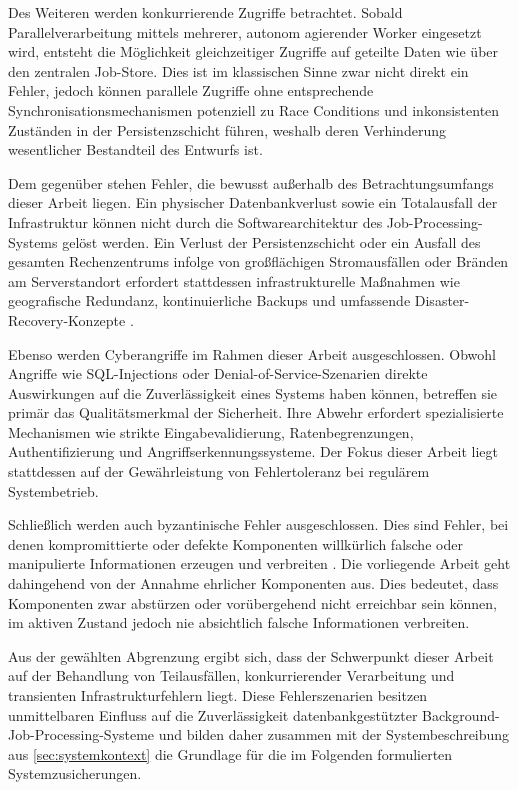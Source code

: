 Des Weiteren werden konkurrierende Zugriffe betrachtet.
Sobald Parallelverarbeitung mittels mehrerer, autonom agierender Worker eingesetzt wird,
entsteht die Möglichkeit gleichzeitiger Zugriffe auf geteilte Daten wie über den zentralen Job-Store.
Dies ist im klassischen Sinne zwar nicht direkt ein Fehler, jedoch können parallele Zugriffe ohne entsprechende Synchronisationsmechanismen
potenziell zu Race Conditions und inkonsistenten Zuständen in der Persistenzschicht führen, weshalb deren Verhinderung wesentlicher Bestandteil des Entwurfs ist.

Dem gegenüber stehen Fehler, die bewusst außerhalb des Betrachtungsumfangs dieser Arbeit liegen.
Ein physischer Datenbankverlust sowie ein Totalausfall der Infrastruktur können nicht durch die Softwarearchitektur des Job-Processing-Systems gelöst werden.
Ein Verlust der Persistenzschicht oder ein Ausfall des gesamten Rechenzentrums infolge von großflächigen Stromausfällen oder Bränden am Serverstandort
erfordert stattdessen infrastrukturelle Maßnahmen wie geografische Redundanz, kontinuierliche Backups und umfassende Disaster-Recovery-Konzepte
\parencite[Kap.~9]{newman_building_2026}.

Ebenso werden Cyberangriffe im Rahmen dieser Arbeit ausgeschlossen.
Obwohl Angriffe wie SQL-Injections oder Denial-of-Service-Szenarien direkte Auswirkungen auf die Zuverlässigkeit eines Systems haben können, betreffen sie
primär das Qualitätsmerkmal der Sicherheit.
Ihre Abwehr erfordert spezialisierte Mechanismen wie strikte Eingabevalidierung, Ratenbegrenzungen, Authentifizierung und Angriffserkennungssysteme.
Der Fokus dieser Arbeit liegt stattdessen auf der Gewährleistung von Fehlertoleranz bei regulärem Systembetrieb.

Schließlich werden auch byzantinische Fehler ausgeschlossen.
Dies sind Fehler, bei denen kompromittierte oder defekte Komponenten willkürlich falsche oder manipulierte Informationen erzeugen und verbreiten
\parencite[Kap.~8 Abschnitt \glqq Byzantine Faults\grqq]{kleppmann_designing_2017}.
Die vorliegende Arbeit geht dahingehend von der Annahme ehrlicher Komponenten aus.
Dies bedeutet, dass Komponenten zwar abstürzen oder vorübergehend nicht erreichbar sein können, im aktiven Zustand jedoch nie absichtlich
falsche Informationen verbreiten.

Aus der gewählten Abgrenzung ergibt sich, dass der Schwerpunkt dieser Arbeit auf der Behandlung von Teilausfällen, konkurrierender Verarbeitung und
transienten Infrastrukturfehlern liegt.
Diese Fehlerszenarien besitzen unmittelbaren Einfluss auf die Zuverlässigkeit datenbankgestützter Background-Job-Processing-Systeme und
bilden daher zusammen mit der Systembeschreibung aus \cref{sec:systemkontext} die Grundlage für die im Folgenden formulierten Systemzusicherungen.

